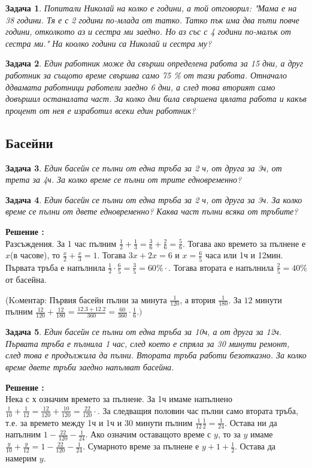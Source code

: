 \documentclass{article}
\newtheorem{problem}{Задача}
\newcounter{solution}
\newcommand\solution{%
	\stepcounter{solution}%
	\textbf{Решение :}\\%
}
\begin{document}
\begin{problem}
	Попитали Николай на колко е години, а той отговорил: "Мама е на 38 години. Тя е с 2 години по-млада от татко. Татко пък има два пъти повче години, отколкото аз и сестра ми заедно. Но аз със с 4 години по-малък от сестра ми." На коолко години са Николай и сестра му?
\end{problem}


\begin{problem}
	Един работник може да свърши определена работа за 15 дни, а друг работник за същото време свършва само 75 \% от тази работа. Отначало ддвамата  работници работели заедно 6 дни, а след това вторият само довършил останалата част. За колко дни била свършена цялата работа и какъв процент от нея е изработил всеки един работник?
\end{problem}

\subsection{Басейни}

\begin{problem}
	Един басейн се пълни от една тръба за 2 ч, от друга за 3ч, от трета за 4ч. За колко време се пълни от трите едновременно? 
\end{problem}


\begin{problem}
	Един басейн се пълни от една тръба за 2 ч, от друга за 3ч. За колко време се пълни от двете едновременно? Каква част пълни всяка от тръбите?
\end{problem}

\solution
Разсъждения. За 1 час пълним $\frac{1}{2} + \frac{1}{3} = \frac{3}{6} + \frac{2}{6} = \frac{5}{6}$. Тогава ако времето за пълнене е $x$(в часове), то $\frac{x}{2} + \frac{x}{3} = 1 $. Тогава $3x + 2x = 6 $ и  $ x = \frac{6}{5}$ часа или 1ч и 12мин. Първата тръба е напълнила $\frac{1}{2}\cdot \frac{6}{5} = \frac{3}{5} = 60\% \cdot $. Тогава втората е напълнила $\frac{2}{5} = 40\%$ от басейна.
 
(Koментар: Първия басейн пълни за минута $\frac{1}{120}$, а втория $\frac{1}{180}.$ За $12$ минути пълним $\frac{12}{120} + \frac{12}{180} = \frac{12.3 + 12.2}{360} = \frac{60}{360} \cdot \frac{1}{6}. )$


\begin{problem}
	Един басейн се пълни от една тръба за 10ч, а от друга за 12ч. Първата тръба е пълнила 1 час, след което е спряла за 30 минути ремонт, след това е продължила да пълни. Втората тръба работи безотказно. За колко време двете тръби заедно напълват басейна.
\end{problem}
\solution 
 Нека с х означим времето за пълнене. За 1ч имаме напълнено $\frac{1}{10} + \frac{1}{12} = \frac{12}{120} + \frac{10}{120} = \frac{22}{120} \cdot$. За следващия половин час пълни само втората тръба, т.е. за времето между 1ч и 1ч и 30 минути пълним $\frac{1}{12} \frac{1}{2} = \frac{1}{24}.$ Остава ни да напълним $1 - \frac{22}{120} - \frac{1}{24}.$ Ако означим оставащото време с $y$, то за $y$ имаме $ \frac{y}{10} + \frac{y}{12} =  1 - \frac{22}{120} - \frac{1}{24}$. Сумарното време за пълнене е $y+1+\frac{1}{2}$. Остава да намерим $y$.
\end{document}

